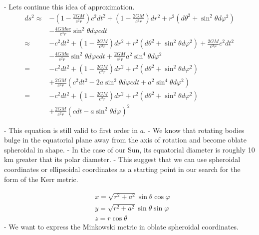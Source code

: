 - Lets continue this idea of approximation.
\begin{equation}
    \begin{aligned}
        d s^2 \approx & -\left(1-\frac{2 G M}{c^2 r}\right) c^2 d t^2+\left(1-\frac{2 G M}{c^2 r}\right) d r^2+r^2\left(d \theta^2+\sin ^2 \theta d \varphi^2\right) \\
                      & -\frac{4 G M a c}{c^3 r} \sin ^2 \theta d \varphi c d t                                                                                      \\
        \approx       & -c^2 d t^2+\left(1-\frac{2 G M}{c^2 r}\right) d r^2+r^2\left(d \theta^2+\sin ^2 \theta d \varphi^2\right)+\frac{2 G M}{c^2 r} c^2 d t^2      \\
                      & -\frac{4 G M a}{c^2 r} \sin ^2 \theta d \varphi c d t+\frac{2 G M}{c^2 r} a^2 \sin ^4 \theta d \varphi^2                                     \\
        =             & -c^2 d t^2+\left(1-\frac{2 G M}{c^2 r}\right) d r^2+r^2\left(d \theta^2+\sin ^2 \theta d \varphi^2\right)                                    \\
                      & +\frac{2 G M}{c^2 r}\left(c^2 d t^2-2 a \sin ^2 \theta d \varphi c d t+a^2 \sin ^4 \theta d \varphi^2\right)                                 \\
        =             & -c^2 d t^2+\left(1-\frac{2 G M}{c^2 r}\right) d r^2+r^2\left(d \theta^2+\sin ^2 \theta d \varphi^2\right)                                    \\
                      & +\frac{2 G M}{c^2 r}\left(c d t-a \sin ^2 \theta d \varphi\right)^2
    \end{aligned}
\end{equation}

- This equation is still valid to first order in $a$.
- We know that rotating bodies bulge in the equatorial plane away from the axis of rotation and become oblate spheroidal in shape.
- In the case of our Sun, its equatorial diameter is roughly 10 km greater that its polar diameter.
- This suggest that we can use spheroidal coordinates or ellipsoidal coordinates as a starting point in our search for the form of the Kerr metric.


\begin{align}
     & x=\sqrt{r^2+a^2} \sin \theta \cos \varphi \\
     & y=\sqrt{r^2+a^2} \sin \theta \sin \varphi \\
     & z=r \cos \theta
\end{align}
- We want to express the Minkowski metric in oblate spheroidal coordinates.

